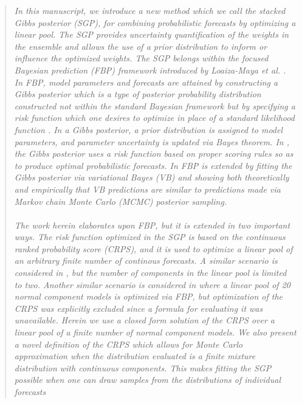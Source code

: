 \documentclass[ba]{imsart}
\newcommand{\1}[1]{\mathds{1}\left[#1\right]}
\begin{document}
\begin{enumerate}[(1)]
\begin{quote}
  \emph{In this manuscript, we introduce a new method which we call the stacked 
  Gibbs posterior (SGP), for combining probabilistic forecasts by optimizing a 
  linear pool. The SGP provides uncertainty quantification of the weights in 
  the ensemble and allows the use of a prior distribution to inform or 
  influence the optimized weights. 
  The SGP belongs within the \textit{focused Bayesian prediction} (FBP) framework
  introduced by Loaiza-Maya et al. \cite[]{loaiza2021focused}. 
  In FBP, model parameters and forecasts are attained by constructing a Gibbs 
  posterior which is a type of posterior probability distribution constructed 
  not within the standard Bayesian framework but by specifying a risk function 
  which one desires to optimize in place of a standard likelihood function 
  \cite[]{martin2022direct,bissiri2016general}. In a Gibbs posterior, a prior
  distribution is assigned to model parameters, and parameter uncertainty is
  updated via Bayes theorem. In \cite[]{loaiza2021focused}, the Gibbs posterior
  uses a risk function based on proper scoring rules so as to produce optimal
  probabilistic 
  forecasts. In \cite[]{frazier2025loss} FBP is extended by fitting
  the Gibbs posterior via variational Bayes (VB)
  and showing both theoretically and 
  empirically that VB predictions are similar to predictions made via Markov
  chain Monte Carlo (MCMC) posterior sampling.}
  \\~\\
  \emph{
  The work herein elaborates upon FBP, but it is extended in two important ways.
  The risk function optimized in the SGP is based on the continuous ranked 
  probability score (CRPS), and it is used to optimize a linear pool of 
  an arbitrary finite number of continous forecasts. 
  A similar scenario is considered in \cite[]{loaiza2021focused}, 
  but the number of components in the 
  linear pool is limited to two. Another similar scenario is considered in
  \cite[]{frazier2025loss} where a linear pool of 20 normal component models is
  optimized via FBP, but optimization of the CRPS was explicitly excluded 
  since a formula for evaluating it was unavailable. 
  Herein we use a closed form
  solution of the CRPS over a linear pool of a finite number of normal component
  models. We also present a novel definition of the CRPS which allows for
  Monte Carlo approximation when the distribution evaluated is a finite mixture
  distribution with continuous components. This makes fitting the SGP possible
  when one can draw samples from the distributions of individual forecasts
}
\end{quote}
\end{enumerate}
\end{document}

